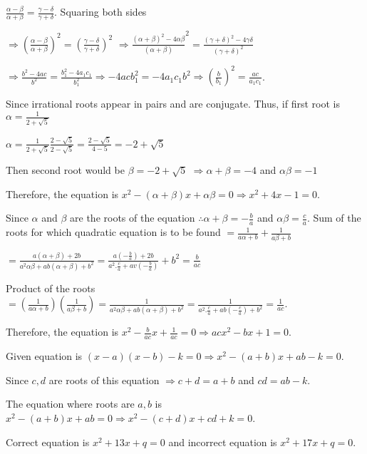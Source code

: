   $\frac{\alpha - \beta}{\alpha + \beta} = \frac{\gamma - \delta}{\gamma + \delta}$. Squaring both sides

  $\Rightarrow \left(\frac{\alpha - \beta}{\alpha + \beta}\right)^2 = \left(\frac{\gamma - \delta}{\gamma +
    \delta}\right)^2$ $\Rightarrow \frac{(\alpha + \beta)^2 - 4\alpha\beta}{(\alpha + \beta)}^2 = \frac{(\gamma + \delta)^2 - 4\gamma\delta}{(\gamma +
      \delta)^2}$

  $\Rightarrow \frac{b^2 - 4ac}{b^2} = \frac{b_1^2 - 4a_1c_1}{b_1^2} \Rightarrow -4acb_1^2 = -4a_1c_1b^2 \Rightarrow
  \left(\frac{b}{b_1}\right)^2 = \frac{ac}{a_1c_1}$.
\item Since irrational roots appear in pairs and are conjugate. Thus, if first root is $\alpha = \frac{1}{2 + \sqrt{5}}$

  $\alpha = \frac{1}{2 + \sqrt{5}}\frac{2 - \sqrt{5}}{2 - \sqrt{5}} = \frac{2 - \sqrt{5}}{4 - 5} = -2 + \sqrt{5}$

  Then second root would be $\beta = -2 + \sqrt{5}$ $\Rightarrow \alpha + \beta = -4$ and $\alpha\beta = -1$

  Therefore, the equation is $x^2 - (\alpha + \beta)x + \alpha\beta = 0 \Rightarrow x^2 + 4x -1 = 0$.
\item Since $\alpha$ and $\beta$ are the roots of the equation $\therefore \alpha + \beta = -\frac{b}{a}$ and
  $\alpha\beta = \frac{c}{a}$. Sum of the roots for which quadratic equation is to be found $=
  \frac{1}{a\alpha + b} + \frac{1}{a\beta + b}$

  $= \frac{a(\alpha + \beta) + 2b}{a^2\alpha\beta + ab(\alpha + \beta) + b^2} = \frac{a\left(-\frac{b}{a}\right) +
    2b}{a^2.\frac{c}{a} + av\left(-\frac{b}{a}\right)} + b^2 = \frac{b}{ac}$

  Product of the roots $= \left(\frac{1}{a\alpha + b}\right)\left(\frac{1}{a\beta + b}\right) =
  \frac{1}{a^2\alpha\beta + ab(\alpha + \beta) + b^2} = \frac{1}{a^2.\frac{c}{a} +
    ab\left(-\frac{c}{a}\right) + b^2} = \frac{1}{ac}$.

  Therefore, the equation is $x^2 - \frac{b}{ac}x + \frac{1}{ac} = 0 \Rightarrow acx^2 - bx + 1 = 0$.
\item Given equation is $(x - a)(x - b) - k = 0 \Rightarrow x^2 - (a + b)x + ab - k = 0$.

  Since $c, d$ are roots of this equation $\Rightarrow c + d = a + b$ and $cd = ab - k$.

  The equation where roots are $a, b$ is $x^2 - (a + b)x + ab = 0 \Rightarrow x^2 - (c + d)x + cd + k = 0$.
\item Correct equation is $x^2 + 13x + q = 0$ and incorrect equation is $x^2 + 17x + q = 0$.

